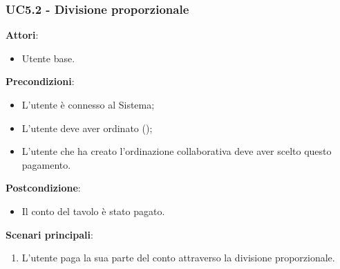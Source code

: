 \subsubsection{UC5.2 - Divisione proporzionale}\label{usecase:5.2}
\textbf{Attori}:
\begin{itemize}
    \item Utente base.
\end{itemize}
\textbf{Precondizioni}:
\begin{itemize}
    \item L'utente è connesso al Sistema;
    \item L'utente deve aver ordinato ();
    \item L'utente che ha creato l'ordinazione collaborativa deve aver scelto questo pagamento.
\end{itemize}
\textbf{Postcondizione}:
\begin{itemize}
    \item Il conto del tavolo è stato pagato.
\end{itemize}
\textbf{Scenari principali}:
\begin{enumerate}
    \item L'utente paga la sua parte del conto attraverso la divisione proporzionale.
\end{enumerate}